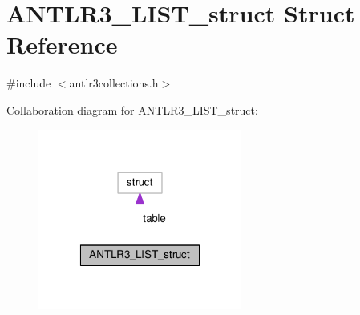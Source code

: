 \hypertarget{struct_a_n_t_l_r3___l_i_s_t__struct}{\section{A\-N\-T\-L\-R3\-\_\-\-L\-I\-S\-T\-\_\-struct Struct Reference}
\label{struct_a_n_t_l_r3___l_i_s_t__struct}
}


{\ttfamily \#include $<$antlr3collections.\-h$>$}



Collaboration diagram for A\-N\-T\-L\-R3\-\_\-\-L\-I\-S\-T\-\_\-struct\-:
\nopagebreak
\begin{figure}[H]
\begin{center}
\leavevmode
\includegraphics[width=190pt]{struct_a_n_t_l_r3___l_i_s_t__struct__coll__graph}
\end{center}
\end{figure}
